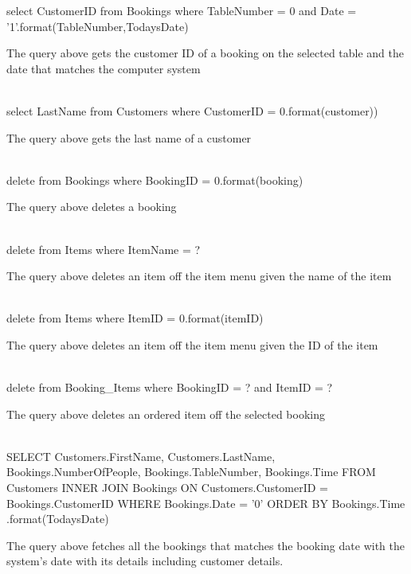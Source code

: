 \begin{sql}
select CustomerID from Bookings where TableNumber = {0} and Date = '{1}'.format(TableNumber,TodaysDate)
\end{sql}
The query above gets the customer ID of a booking on the selected table and the date that matches the computer system \\ \\

\begin{sql}
select LastName from Customers where CustomerID = {0}.format(customer))
\end{sql}
The query above gets the last name of a customer \\ \\



\begin{sql}
delete from Bookings where BookingID = {0}.format(booking)
\end{sql}
The query above deletes a booking \\ \\



\begin{sql}
delete from Items where ItemName = ?
\end{sql}
The query above deletes an item off the item menu given the name of the item \\ \\


\begin{sql}
delete from Items where ItemID = {0}.format(itemID)
\end{sql}
The query above deletes an item off the item menu given the ID of the item \\ \\


\begin{sql}
delete from Booking_Items where BookingID = ? and ItemID = ? 
\end{sql}
The query above deletes an ordered item off the selected booking \\ \\

\begin{sql}
SELECT
 Customers.FirstName,
Customers.LastName,
 Bookings.NumberOfPeople,
 Bookings.TableNumber,
 Bookings.Time
FROM Customers
 INNER JOIN Bookings
 ON Customers.CustomerID = Bookings.CustomerID
 WHERE Bookings.Date = '{0}'
 ORDER BY Bookings.Time
.format(TodaysDate)
\end{sql}
The query above fetches all the bookings that matches the booking date with the system's date with its details including customer details. \\ \\

